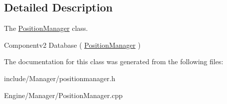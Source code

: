 \subsection{Detailed Description}
The \hyperlink{classEngine_1_1PositionManager}{Position\+Manager} class. 

Componentv2 Database ( \hyperlink{classEngine_1_1PositionManager}{Position\+Manager} ) 

The documentation for this class was generated from the following files\+:\begin{DoxyCompactItemize}
\item 
include/\+Manager/positionmanager.\+h\item 
Engine/\+Manager/Position\+Manager.\+cpp\end{DoxyCompactItemize}

